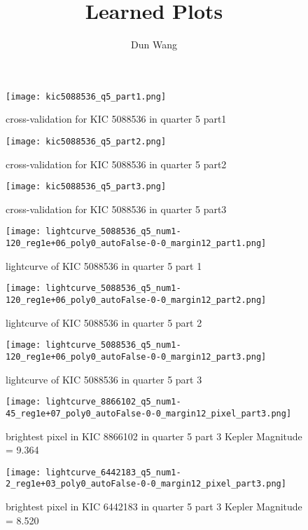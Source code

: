 \documentclass[]{article}
\begin{document}
\title{Learned Plots}
\author{Dun Wang}
\maketitle

\begin{figure}[H]
\centering
\texttt{[image: kic5088536\_q5\_part1.png]}
\caption{cross-validation for KIC 5088536 in quarter 5 part1}
\end{figure}

\begin{figure}[H]
\centering
\texttt{[image: kic5088536\_q5\_part2.png]}
\caption{cross-validation for KIC 5088536 in quarter 5 part2}
\end{figure}

\begin{figure}[H]
\centering
\texttt{[image: kic5088536\_q5\_part3.png]}
\caption{cross-validation for KIC 5088536 in quarter 5 part3}
\end{figure}


\begin{figure}[H]
\centering
\texttt{[image: lightcurve\_5088536\_q5\_num1-120\_reg1e+06\_poly0\_autoFalse-0-0\_margin12\_part1.png]}
\caption{lightcurve of KIC 5088536 in quarter 5 part 1}
\end{figure}

\begin{figure}[H]
\centering
\texttt{[image: lightcurve\_5088536\_q5\_num1-120\_reg1e+06\_poly0\_autoFalse-0-0\_margin12\_part2.png]}
\caption{lightcurve of KIC 5088536 in quarter 5 part 2}
\end{figure}

\begin{figure}[H]
\centering
\texttt{[image: lightcurve\_5088536\_q5\_num1-120\_reg1e+06\_poly0\_autoFalse-0-0\_margin12\_part3.png]}
\caption{lightcurve of KIC 5088536 in quarter 5 part 3}
\end{figure}

\begin{figure}[H]
\centering
\texttt{[image: lightcurve\_8866102\_q5\_num1-45\_reg1e+07\_poly0\_autoFalse-0-0\_margin12\_pixel\_part3.png]}
\caption{brightest pixel in KIC 8866102 in quarter 5 part 3 Kepler Magnitude = 9.364}
\end{figure}

\begin{figure}[H]
\centering
\texttt{[image: lightcurve\_6442183\_q5\_num1-2\_reg1e+03\_poly0\_autoFalse-0-0\_margin12\_pixel\_part3.png]}
\caption{brightest pixel in KIC 6442183 in quarter 5 part 3 Kepler Magnitude = 8.520}
\end{figure}
\end{document}

